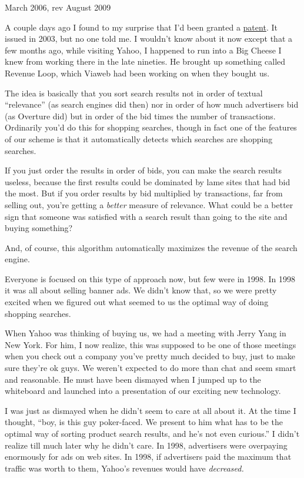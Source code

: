 March 2006, rev August 2009

A couple days ago I found to my surprise that I'd been granted a
\href{http://patft.uspto.gov/netacgi/nph-Parser?Sect1=PTO1&Sect2=HITOFF&d=PALL&p=1&u=\%2Fnetahtml\%2FPTO\%2Fsrchnum.htm&r=1&f=G&l=50&s1=6,631,372.PN.&OS=PN/6,631,372&RS=PN/6,631,372}{patent}.
It issued in 2003, but no one told me. I wouldn't know about it now
except that a few months ago, while visiting Yahoo, I happened to run
into a Big Cheese I knew from working there in the late nineties. He
brought up something called Revenue Loop, which Viaweb had been working
on when they bought us.

The idea is basically that you sort search results not in order of
textual ``relevance'' (as search engines did then) nor in order of how
much advertisers bid (as Overture did) but in order of the bid times the
number of transactions. Ordinarily you'd do this for shopping searches,
though in fact one of the features of our scheme is that it
automatically detects which searches are shopping searches.

If you just order the results in order of bids, you can make the search
results useless, because the first results could be dominated by lame
sites that had bid the most. But if you order results by bid multiplied
by transactions, far from selling out, you're getting a \emph{better}
measure of relevance. What could be a better sign that someone was
satisfied with a search result than going to the site and buying
something?

And, of course, this algorithm automatically maximizes the revenue of
the search engine.

Everyone is focused on this type of approach now, but few were in 1998.
In 1998 it was all about selling banner ads. We didn't know that, so we
were pretty excited when we figured out what seemed to us the optimal
way of doing shopping searches.

When Yahoo was thinking of buying us, we had a meeting with Jerry Yang
in New York. For him, I now realize, this was supposed to be one of
those meetings when you check out a company you've pretty much decided
to buy, just to make sure they're ok guys. We weren't expected to do
more than chat and seem smart and reasonable. He must have been dismayed
when I jumped up to the whiteboard and launched into a presentation of
our exciting new technology.

I was just as dismayed when he didn't seem to care at all about it. At
the time I thought, ``boy, is this guy poker-faced. We present to him
what has to be the optimal way of sorting product search results, and
he's not even curious.'' I didn't realize till much later why he didn't
care. In 1998, advertisers were overpaying enormously for ads on web
sites. In 1998, if advertisers paid the maximum that traffic was worth
to them, Yahoo's revenues would have \emph{decreased.}

